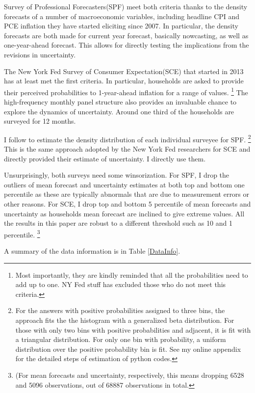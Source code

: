 \documentclass[]{article}
\begin{document}
	Survey of Professional Forecasters(SPF) meet both criteria thanks to the density forecasts of a number of macroeconomic variables, including headline CPI and PCE inflation they have started eliciting since 2007. In particular, the density forecasts are both made for current year forecast, basically nowcasting, as well as one-year-ahead forecast. This allows for directly testing the implications from the revisions in uncertainty.  
	
	The New York Fed Survey of Consumer Expectation(SCE) that started in 2013 has at least met the first criteria. In particular, households are asked to provide their perceived probabilities to 1-year-ahead inflation for a range of values. \footnote{Most importantly, they are kindly reminded that all the probabilities need to add up to one. NY Fed stuff has excluded those who do not meet this criteria.} The high-frequency monthly panel structure also provides an invaluable chance to explore the dynamics of uncertainty. Around one third of the households are surveyed for 12 months.  
	
	I follow \citet{engelberg2009comparing} to estimate the density distribution of each individual surveyee for SPF. \footnote{For the answers with positive probabilities assigned to three bins, the approach fits the the histogram with a generalized beta distribution. For those with only two bins with positive probabilities and adjacent, it is fit with a triangular distribution. For only one bin with probability, a uniform distribution over the positive probability bin is fit. See my online appendix for the detailed steps of estimation of python codes.} This is the same approach adopted by the New York Fed researchers \citet{armantier2017overview} for SCE and directly provided their estimate of uncertainty. I directly use them. 
	
	Unsurprisingly, both surveys need some  winsorization. For SPF, I drop the outliers of mean forecast and uncertainty estimates at both top and bottom one percentile as these are typically abnormals that are due to measurement errors or other reasons.   For SCE, I drop top and bottom 5 percentile of mean forecasts and uncertainty as households mean forecast are inclined to give extreme values. All the results in this paper are robust to a different threshold such as 10 and 1 percentile. \footnote{(For mean forecasts and uncertainty, respectively, this means dropping 6528 and 5096 observations, out of 68887 observations in total.}
	
	A summary of the data information is in Table \ref{DataInfo}. 
\end{document}
